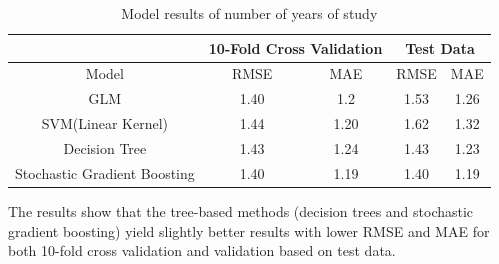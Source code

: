 \documentclass[12pt,english]{report}
\begin{document}
\begin{table}[H]
\centering
\caption{Model results of number of years of study}
\label{num_year}
\begin{tabular}{|c|c|c|c|c|} \hline
                             & \multicolumn{2}{c|}{10-Fold Cross Validation} &
\multicolumn{2}{c|}{Test Data} \\ \hline
Model                        & RMSE                  & MAE                   & RMSE           & MAE           \\ \hline
GLM                          & 1.40                  & 1.2                   & 1.53           & 1.26          \\ \hline
SVM(Linear Kernel)           & 1.44                  & 1.20                  & 1.62           & 1.32          \\ \hline
Decision Tree                         & 1.43                  & 1.24        & 1.43           & 1.23          \\ \hline
Stochastic Gradient Boosting & 1.40                  & 1.19                  & 1.40           & 1.19           \\ \hline
\end{tabular}
\end{table}

The results show that the tree-based methods (decision trees and stochastic gradient boosting) yield slightly better results with lower RMSE and MAE for both 10-fold cross validation and validation based on test data.
\end{document}
